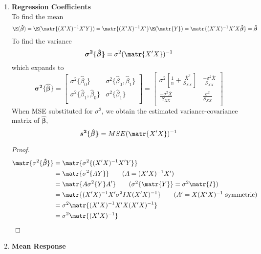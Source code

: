 \documentclass[11pt]{article}
\begin{document}
\begin{enumerate}
    \item \textbf{Regression Coefficients} \\
    To find the mean
    \[
        \E( \boldsymbol{\hat{\beta}} )
         = \E( \matr{(X'X)^{-1} X'Y} )
         = \matr{(X'X)^{-1} X'} \E( \matr{Y} )
         = \matr{(X'X)^{-1} X' X\boldsymbol{\hat{\beta}}} 
         = \boldsymbol{\hat{\beta}}
    \]
    To find the variance
    \[
        \boldsymbol{\sigma^2}\{\boldsymbol{\hat{\beta}\}}
        = \sigma^2 (\matr{X'X})^{-1}
    \]
    which expands to 
    \[
        \boldsymbol{\sigma^2}\{\boldsymbol{\hat{\beta}\}}
        = 
        \begin{bmatrix}
            \sigma^2\{ \hat{\beta}_0 \} & \sigma^2\{ \hat{\beta}_0, \hat{\beta}_1 \} \\
            \sigma^2\{ \hat{\beta}_1, \hat{\beta}_0 \} & \sigma^2\{ \hat{\beta}_1 \} \\ 
        \end{bmatrix}
        = 
        \begin{bmatrix}
            \sigma^2 \left[ \frac{1}{n} + \frac{\overline{X}^2}{S_{XX}} \right]  & \frac{-\sigma^2 \overline{X}}{S_{XX}} \\
            \frac{-\sigma^2 \overline{X}}{S_{XX}} & \frac{\sigma^2}{S_{XX}} \\ 
        \end{bmatrix}
    \]
    When MSE substituted for $\sigma^2$, we obtain the estimated variance-covariance matrix of $\boldsymbol{\hat{\beta}}$, 
    \[
        \boldsymbol{s^2}\{\boldsymbol{\hat{\beta}\}}
        = MSE (\matr{X'X})^{-1}
    \]
    \begin{proof}
        \begin{align*}
            \matr{\sigma^2\{ \boldsymbol{\hat{\beta}} \}} 
            &= \matr{\sigma^2\{ (X'X)^{-1}X'Y \}}  \\
            &=  \matr{\sigma^2\{ AY \}}  \tag{$A = (X'X)^{-1}X'$} \\
            &= \matr{A\sigma^2\{ Y \}A'} 
                \tag{$\sigma^2\{\matr{Y}\} = \sigma^2\matr{I}$}\\
            &= \matr{(X'X)^{-1}X' \sigma^2 I X(X'X)^{-1}} 
                \tag{$A'= X(X'X)^{-1}$ symmetric}\\
            &= \sigma^2 \matr{(X'X)^{-1} X'X (X'X)^{-1}} \\
            &= \sigma^2 \matr{(X'X)^{-1}} \\ 
        \end{align*}
    \end{proof}
    \item \textbf{Mean Response} 
\end{enumerate}
\end{document}
